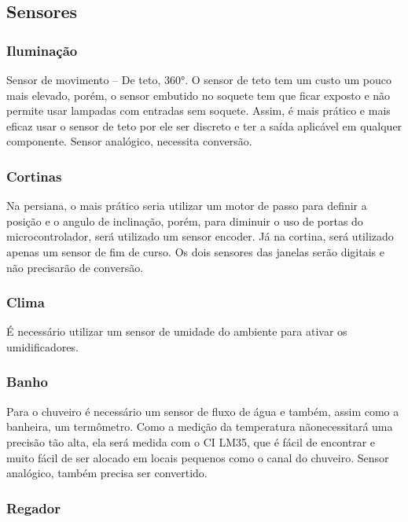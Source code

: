 \subsection{Sensores}

\subsubsection*{Iluminação}

	Sensor de movimento – De teto, 360°. O sensor de teto tem um custo um pouco mais elevado, porém, o sensor embutido no soquete tem que ficar exposto e não permite usar lampadas com entradas sem soquete. Assim, é mais prático e mais eficaz usar o sensor de teto por ele ser discreto e ter a saída aplicável em qualquer componente\cite{2014Thiago}. Sensor analógico, necessita conversão.

\subsubsection*{Cortinas}

	Na persiana, o mais prático seria utilizar um motor de passo para definir a posição e o angulo de inclinação, porém, para diminuir o uso de portas do microcontrolador, será utilizado um sensor encoder. Já na cortina, será utilizado apenas um sensor de fim de curso. Os dois sensores das janelas serão digitais e não precisarão de conversão.

\subsubsection*{Clima}

	É necessário utilizar um sensor de umidade do ambiente para ativar os umidificadores.

\subsubsection*{Banho}

	Para o chuveiro é necessário um sensor de fluxo de água e também, assim como a banheira, um termômetro. Como a medição da temperatura nãonecessitará uma precisão tão alta, ela será medida com o CI LM35\cite{SNIS159E}, que é fácil de encontrar e muito fácil de ser alocado em locais pequenos como o canal do chuveiro. Sensor analógico, também precisa ser convertido.

\subsubsection*{Regador}

